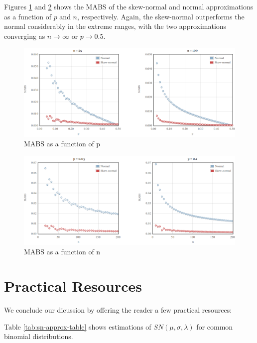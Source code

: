 \documentclass{article}
\begin{document}
Figures \ref{fig:mabs-fixed-n} and \ref{fig:mabs-fixed-p} shows the MABS of the
skew-normal and normal approximations as a function of $p$ and $n$,
respectively. Again, the skew-normal outperforms the normal considerably in the
extreme ranges, with the two approximations converging as $n \rightarrow
\infty$ or $p \rightarrow 0.5$.

\begin{figure}
  \centering
  \includegraphics[width=\textwidth]{../images/mabs-fixed-n.png}
  \caption{MABS as a function of p}
  \label{fig:mabs-fixed-n}
\end{figure}

\begin{figure}
  \centering
  \includegraphics[width=\textwidth]{../images/mabs-fixed-p.png}
  \caption{MABS as a function of n}
  \label{fig:mabs-fixed-p}
\end{figure}

\clearpage

\section{Practical Resources}
\label{sec:resources}

We conclude our dicussion by offering the reader a few practical resources:

Table \ref{tab:sn-approx-table} shows estimations of $SN(\mu, \sigma, \lambda)$
for common binomial distributions.
\end{document}
